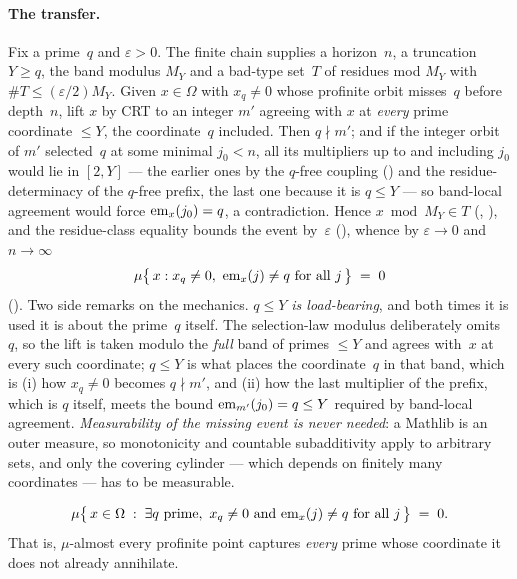 \paragraph{The transfer.}
Fix a prime~$q$ and $\varepsilon>0$.  The finite chain supplies a
horizon~$n$, a truncation $Y \geq q$, the band modulus $M_Y$ and a bad-type
set~$T$ of residues mod $M_Y$ with $\#T \le (\varepsilon/2)M_Y$.  Given
$x \in \Omega$ with $x_q \neq 0$ whose profinite orbit misses~$q$ before
depth~$n$, lift $x$ by CRT to an integer $m'$ agreeing with $x$ at
\emph{every} prime coordinate $\le Y$, the coordinate~$q$ included.  Then
$q \nmid m'$; and if the integer orbit of $m'$ selected~$q$ at some minimal
$j_0 < n$, all its multipliers up to and including $j_0$ would lie in
$[2,Y]$ --- the earlier ones by the $q$-free coupling
()
and the residue-determinacy of the $q$-free prefix, the last one because it
is $q \le Y$ --- so band-local agreement would force $\mathrm{em}_{x}(j_0) = q$, a
contradiction.  Hence $x \bmod M_Y \in T$
(,
), and the
residue-class equality bounds the event by~$\varepsilon$
(), whence
by $\varepsilon \to 0$ and $n \to \infty$
\[
  \mu\bigl\{\, x : x_q \neq 0,\ \mathrm{em}_{x}(j) \neq q\ \text{for all } j \,\bigr\}
   \;=\; 0
\]
().
Two side remarks on the mechanics.  \emph{$q \le Y$ is load-bearing}, and
both times it is used it is about the prime~$q$ itself.  The selection-law
modulus deliberately omits~$q$, so the lift is taken modulo the
\emph{full} band of primes $\le Y$ and agrees with~$x$ at every such
coordinate; $q \le Y$ is what places the coordinate~$q$ in that band,
which is (i) how $x_q \neq 0$ becomes $q \nmid m'$, and (ii) how the last
multiplier of the prefix, which is $q$ itself, meets the bound
$\mathrm{em}_{m'}(j_0) = q \le Y$ required by band-local agreement.
\emph{Measurability of the missing event is never needed}: a Mathlib
 is an outer measure, so monotonicity and countable
subadditivity apply to arbitrary sets, and only the covering cylinder ---
which depends on finitely many coordinates --- has to be measurable.

\begin{theorem}
\label{thm:profinite-headline}
\[
  \mu\bigl\{\, x \in \Omega \;:\; \exists q \text{ prime},\
     x_q \neq 0 \ \text{and}\ \mathrm{em}_{x}(j) \neq q \ \text{for all } j \,\bigr\}
  \;=\; 0 .
\]
That is, $\mu$-almost every profinite point captures \emph{every} prime
whose coordinate it does not already annihilate.
\end{theorem}

